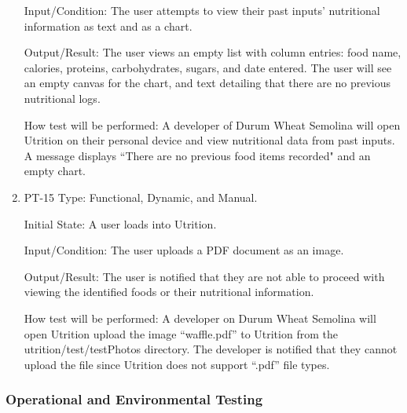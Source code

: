 \documentclass[12pt, titlepage]{article}
\begin{document}
\begin{enumerate}
		Input/Condition: The user attempts to view their past inputs' nutritional information as text and as a chart.
		
		Output/Result: The user views an empty list with column entries: food name, calories, proteins, carbohydrates, sugars, and date entered. The user will see an empty canvas for the chart, and text detailing that there are no previous nutritional logs.
		
		How test will be performed: A developer of Durum Wheat Semolina will open Utrition on their personal device and view nutritional data from past inputs. A message displays “There are no previous food items recorded" and an empty chart.
		
		\item{PT-15}
		Type: Functional, Dynamic, and Manual.
		
		Initial State: A user loads into Utrition.
		
		Input/Condition: The user uploads a PDF document as an image.
		
		Output/Result: The user is notified that they are not able to proceed with viewing the identified foods or their nutritional information.
		
		How test will be performed: A developer on Durum Wheat Semolina will open Utrition upload the image “waffle.pdf” to Utrition from the utrition/test/testPhotos directory. The developer is notified that they cannot upload the file since Utrition does not support “.pdf” file types.
		
	\end{enumerate}
	
	\subsubsection{Operational and Environmental Testing}
	
	
\end{document}
